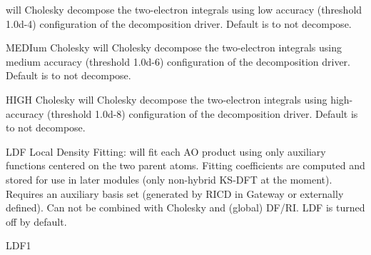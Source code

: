 \begin{keywordlist}
 will Cholesky decompose the two-{}electron integrals using
low accuracy (threshold 1.0d{}-4)
configuration of the decomposition driver.
Default is to not decompose.
\item[MEDIum Cholesky]
 will Cholesky decompose the two-{}electron integrals using
medium accuracy (threshold 1.0d{}-6)
configuration of the decomposition driver.
Default is to not decompose.
\item[HIGH Cholesky]
 will Cholesky decompose the two-{}electron integrals using
high-accuracy (threshold 1.0d-8)
configuration of the decomposition driver.
Default is to not decompose.
\item[LDF]
Local Density Fitting:  will fit each AO product using only auxiliary functions centered on the two parent atoms.
Fitting coefficients are computed and stored for use in later modules (only non-hybrid KS-DFT at the moment).
Requires an auxiliary basis set (generated by RICD in Gateway or externally defined).
Can not be combined with Cholesky and (global) DF/RI. LDF is turned off by default.
\item[LDF1]

\end{keywordlist}
